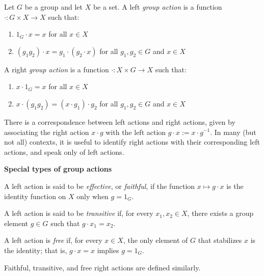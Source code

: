 \documentclass{article}
\begin{document}
Let $G$ be a group and let $X$ be a set. A left {\em group action} is a function $\cdot: G \times X \longrightarrow X$ such that:
\begin{enumerate}
\item $1_G \cdot x = x$ for all $x \in X$
\item $(g_1 g_2)\cdot x = g_1 \cdot (g_2 \cdot x)$ for all $g_1, g_2 \in G$ and $x \in X$
\end{enumerate}

A right {\em group action} is a function $\cdot: X \times G \longrightarrow X$ such that:
\begin{enumerate}
\item $x \cdot 1_G = x$ for all $x \in X$
\item $x \cdot (g_1 g_2) = (x \cdot g_1) \cdot g_2$ for all $g_1, g_2 \in G$ and $x \in X$
\end{enumerate}

There is a correspondence between left actions and right actions, given by associating the right action $x \cdot g$ with the left action $g \cdot x := x \cdot g^{-1}$. In many (but not all) contexts, it is useful to identify right actions with their corresponding left actions, and speak only of left actions.

{\bf Special types of group actions}

A left action is said to be {\em effective}, or {\em faithful}, if the function $x \mapsto g \cdot x$ is the identity function on $X$ only when $g = 1_G$.

A left action is said to be {\em transitive} if, for every $x_1,x_2 \in X$, there exists a group element $g \in G$ such that $g \cdot x_1 = x_2$.

A left action is {\em free} if, for every $x \in X$, the only element of $G$ that stabilizes $x$ is the identity; that is, $g \cdot x = x$ implies $g = 1_G$.

Faithful, transitive, and free right actions are defined similarly.
\end{document}
